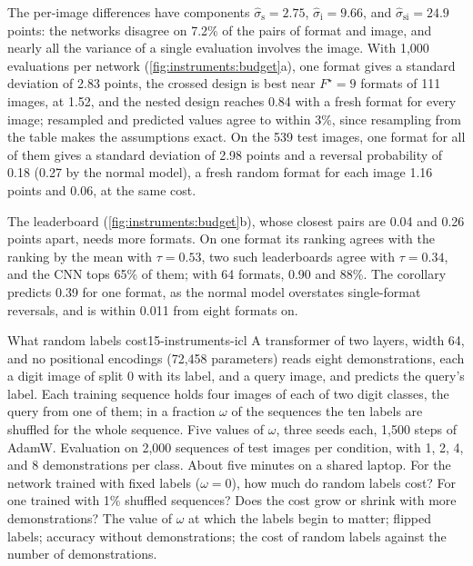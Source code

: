 \begin{refsection}
The per-image differences have components $\hat\sigma_{\mathrm s}=2.75$, $\hat\sigma_{\mathrm i}=9.66$, and $\hat\sigma_{\mathrm{si}}=24.9$ points: the networks disagree on 7.2\% of the pairs of format and image, and nearly all the variance of a single evaluation involves the image. With 1,000 evaluations per network (\cref{fig:instruments:budget}a), one format gives a standard deviation of 2.83 points, the crossed design is best near $F^\star=9$ formats of 111 images, at 1.52, and the nested design reaches 0.84 with a fresh format for every image; resampled and predicted values agree to within 3\%, since resampling from the table makes the assumptions exact. On the 539 test images, one format for all of them gives a standard deviation of 2.98 points and a reversal probability of 0.18 (0.27 by the normal model), a fresh random format for each image 1.16 points and 0.06, at the same cost.

The leaderboard (\cref{fig:instruments:budget}b), whose closest pairs are 0.04 and 0.26 points apart, needs more formats. On one format its ranking agrees with the ranking by the mean with $\tau=0.53$, two such leaderboards agree with $\tau=0.34$, and the CNN tops 65\% of them; with 64 formats, 0.90 and 88\%. The corollary predicts 0.39 for one format, as the normal model overstates single-format reversals, and is within 0.011 from eight formats on.

\begin{lab}{What random labels cost}{15-instruments-icl}\label{lab:instruments:icl}
 A transformer of two layers, width 64, and no positional encodings (72,458 parameters) reads eight demonstrations, each a digit image of split 0 with its label, and a query image, and predicts the query's label. Each training sequence holds four images of each of two digit classes, the query from one of them; in a fraction $\omega$ of the sequences the ten labels are shuffled for the whole sequence. Five values of $\omega$, three seeds each, 1,500 steps of AdamW. Evaluation on 2,000 sequences of test images per condition, with 1, 2, 4, and 8 demonstrations per class. About five minutes on a shared laptop.
 For the network trained with fixed labels ($\omega=0$), how much do random labels cost? For one trained with 1\% shuffled sequences? Does the cost grow or shrink with more demonstrations?
 The value of $\omega$ at which the labels begin to matter; flipped labels; accuracy without demonstrations; the cost of random labels against the number of demonstrations.
\end{lab}


\end{refsection}
